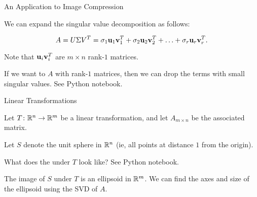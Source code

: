 \documentclass[xcolor=dvipsnames,aspectratio=169,t]{beamer}
\begin{document}
\begin{frame}{An Application to Image Compression}
  \bigskip
  
  We can expand the singular value decomposition as follows:
  
  \[
    A=U \Sigma V^T = \sigma_1 \mathbf{u}_1 \mathbf{v}_1^T + \sigma_2 \mathbf{u}_2 \mathbf{v}_2^T + \ldots + \sigma_r \mathbf{u}_r \mathbf{v}_r^T.
  \]
  \smallskip
  
  \pause
  Note that $\mathbf{u}_i \mathbf{v}_i^T$ are $m \times n$ \alert{rank-$1$} matrices.
  \bigskip
  
  \pause
  If we want to  $A$ with rank-$1$ matrices, then we can drop the terms with small singular values.  See Python notebook.
  
\end{frame}

\begin{frame}{Linear Transformations}
  \bigskip
  
  Let $T\colon\mathbb{R}^n\to\mathbb{R}^m$ be a linear transformation, and let $A_{m\times n}$ be the associated matrix.
  \medskip
  
  Let $S$ denote the \alert{unit sphere} in $\mathbb{R}^n$ (ie, all points at distance $1$ from the origin).
  \bigskip
  
  What does the  under $T$ look like?  See Python notebook.
  \medskip
  
  \pause
  The image of $S$ under $T$ is an \alert{ellipsoid} in $\mathbb{R}^m$.  We can find the axes and size of the ellipsoid using the SVD of $A$.
  
\end{frame}
\end{document}
